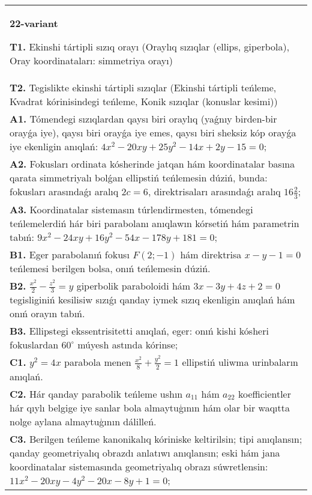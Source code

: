 \documentclass{article}
\begin{document}
\begin{tabular}{m{17cm}}
\textbf{22-variant}
\newline

\textbf{T1.} Ekinshi tártipli sızıq orayı (Oraylıq sızıqlar (ellips, giperbola), Oray koordinataları: simmetriya orayı) \\
\textbf{T2.} Tegislikte ekinshi tártipli sızıqlar (Ekinshi tártipli teńleme, Kvadrat kórinisindegi teńleme, Konik sızıqlar (konuslar kesimi)) \\
\textbf{A1.} Tómendegi sızıqlardan qaysı biri oraylıq (yaǵnıy birden-bir orayǵa iye), qaysı biri orayǵa iye emes, qaysı biri sheksiz kóp orayǵa iye ekenligin anıqlań: $4 x^2-20 x y+25 y^2-14 x+2 y-15=0$; \\
\textbf{A2.} Fokusları ordinata kósherinde jatqan hám koordinatalar basına qarata simmetriyalı bolǵan ellipstiń teńlemesin dúziń, bunda: fokusları arasındaǵı aralıq $2 c=6$, direktrisaları arasındaǵı aralıq $16 \frac{2}{3}$; \\
\textbf{A3.} Koordinatalar sistemasın túrlendirmesten, tómendegi teńlemelerdiń hár biri parabolanı anıqlawın kórsetiń hám parametrin tabıń: $9 x^2-24 x y+16 y^2-54 x-178 y+181=0$; \\
\textbf{B1.} Eger parabolanıń fokusı $F(2;-1) $ hám direktrisa $x-y-1=0$ teńlemesi berilgen bolsa, onıń teńlemesin dúziń. \\
\textbf{B2.} $\frac{x^2}{2}-\frac{z^2}{3}=y$ giperbolik paraboloidi hám $3x-3y+4z+2=0$ tegisliginiń kesilisiw sızıǵı qanday iymek sızıq ekenligin anıqlań hám onıń orayın tabıń. \\
\textbf{B3.} Ellipstegi ekssentrisitetti anıqlań, eger: onıń kishi kósheri fokuslardan $60^{\circ}$ múyesh astında kórinse; \\
\textbf{C1.} $y^2=4 x$ parabola menen $\frac{x^2}{8}+\frac{y^2}{2}=1$ ellipstiń uliwma urinbaların anıqlań. \\
\textbf{C2.} Hár qanday parabolik teńleme ushın $a_{11}$ hám $a_{22}$ koefficientler hár qıylı belgige iye sanlar bola almaytuģının hám olar bir waqıtta nolge aylana almaytuģının dálilleń. \\
\textbf{C3.} Berilgen teńleme kanonikalıq kóriniske keltirilsin; tipi anıqlansın; qanday geometriyalıq obrazdı anlatıwı anıqlansın; eski hám jana koordinatalar sistemasında geometriyalıq obrazı súwretlensin: $11 x^2-20 x y-4 y^2-20 x-8 y+1=0$; \\

\end{tabular}
\vspace{1cm}
\end{document}
